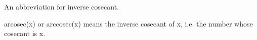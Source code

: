 An abbreviation for inverse cosecant.
\par
arcosec(x) or arccosec(x) means the inverse cosecant of
x, i.e. the number whose cosecant is x.